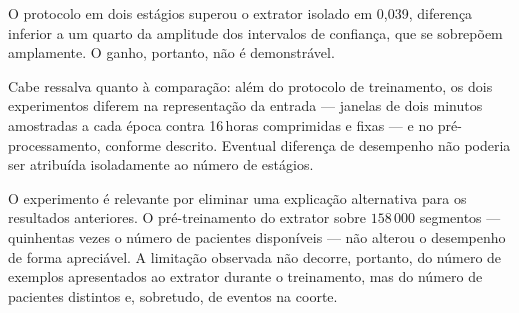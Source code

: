 \begin{table}[h!]
	\captionsetup{width=15cm}
\end{table}

O protocolo em dois estágios superou o extrator isolado em 0,039, diferença
inferior a um quarto da amplitude dos intervalos de confiança, que se
sobrepõem amplamente. O ganho, portanto, não é demonstrável.

Cabe ressalva quanto à comparação: além do protocolo de treinamento, os dois
experimentos diferem na representação da entrada --- janelas de dois minutos
amostradas a cada época contra 16\,horas comprimidas e fixas --- e no
pré-processamento, conforme descrito. Eventual diferença de desempenho não
poderia ser atribuída isoladamente ao número de estágios.

O experimento é relevante por eliminar uma explicação alternativa para os
resultados anteriores. O pré-treinamento do extrator sobre $158\,000$
segmentos --- quinhentas vezes o número de pacientes disponíveis --- não
alterou o desempenho de forma apreciável. A limitação observada não decorre,
portanto, do número de exemplos apresentados ao extrator durante o
treinamento, mas do número de pacientes distintos e, sobretudo, de eventos
na coorte.










